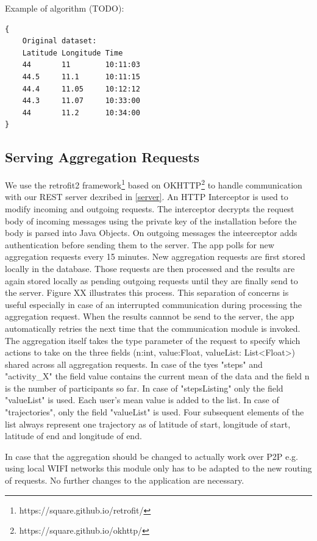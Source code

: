 Example of algorithm (TODO):
\begin{verbatim}
{
	Original dataset:			
	Latitude Longitude Time
	44		 11		   10:11:03
	44.5	 11.1	   10:11:15
	44.4	 11.05	   10:12:12
	44.3	 11.07	   10:33:00
	44	     11.2	   10:34:00
}
\end{verbatim}

\subsection{Serving Aggregation Requests}
We use the retrofit2 framework\footnote{https://square.github.io/retrofit/} based on OKHTTP\footnote{https://square.github.io/okhttp/} to handle communication with our REST server dexribed in \ref{server}. An HTTP Interceptor is used to modify incoming and outgoing requests. The interceptor decrypts the request body of incoming messages using the private key of the installation before the body is parsed into Java Objects. On outgoing messages the inteerceptor adds authentication before sending them to the server.
The app polls for new aggregation requests every 15 minutes. New aggregation requests are first stored locally in the database. Those requests are then processed and the results are again stored locally as pending outgoing requests until they are finally send to the server. Figure XX illustrates this process. This separation of concerns is useful especially in case of an interrupted communication during processing the aggregation request. When the results cannnot be send to the server, the app automatically retries the next time that the communication module is invoked.
The aggregation itself takes the type parameter of the request to specify which actions to take on the three fields (n:int, value:Float, valueList: List<Float>) shared across all aggregation requests. In case of the tyes "steps" and "activity\_X" the field value contains the current mean of the data and the field n is the number of participants so far. In case of "stepsListing" only the field "valueList" is used. Each user's mean value is added to the list. In case of "trajectories", only the field "valueList" is used. Four subsequent elements of the list always represent one trajectory as of latitude of start, longitude of start, latitude of end and longitude of end.

In case that the aggregation should be changed to actually work over P2P e.g. using local WIFI networks this module only has to be adapted to the new routing of requests. No further changes to the application are necessary.

